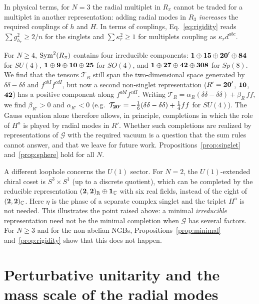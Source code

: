 \documentclass[aps,prd,twocolumn,superscriptaddress,nofootinbib,floatfix]{revtex4-2}
\theoremstyle{remark}
\newcommand{\G}{\mathcal{G}}
\begin{document}
In physical terms, for $N=3$ the radial multiplet in $R_\pi$ cannot be traded for a multiplet in another representation: adding radial modes in $R_3$ \emph{increases} the required couplings of $h$ and $H$. In terms of couplings, Eq.~\eqref{eq:rigidity} reads $\sum g_{h_r}^2\ge 2/n$ for the singlets and $\sum\kappa_r^2\ge1$ for multiplets coupling as $\kappa_r d^{abc}$.

For $N\ge4$, ${\rm Sym}^2(R_\pi)$ contains four irreducible components: ${\bf 1}\oplus{\bf 15}\oplus{\bf 20}'\oplus{\bf 84}$ for $SU(4)$, ${\bf 1}\oplus{\bf 9}\oplus{\bf 10}\oplus{\bf 25}$ for $SO(4)$, and ${\bf 1}\oplus{\bf 27}\oplus{\bf 42}\oplus{\bf 308}$ for $Sp(8)$. We find that the tensors $\mathcal{T}_R$ still span the two-dimensional space generated by $\delta\delta-\delta\delta$ and $f^{abI}f^{cdI}$, but now a second non-singlet representation ($R'={\bf 20}'$, ${\bf 10}$, ${\bf 42}$) has a positive component along $f^{abI}f^{cdI}$. Writing $\mathcal{T}_R=\alpha_R(\delta\delta-\delta\delta)+\beta_R\,ff$, we find $\beta_{R'}>0$ and $\alpha_{R'}<0$ (e.g.\ $\mathcal{T}_{{\bf 20}'}=-\frac16(\delta\delta-\delta\delta)+\frac14ff$ for $SU(4)$). The Gauss equation alone therefore allows, in principle, completions in which the role of $H^a$ is played by radial modes in $R'$. Whether such completions are realized by representations of $\G$ with the required vacuum is a question that the sum rules cannot answer, and that we leave for future work. Propositions~\ref{prop:singlet} and~\ref{prop:sphere} hold for all $N$.

A different loophole concerns the $U(1)$ sector. For $N=2$, the $U(1)$-extended chiral coset is $S^3\times S^1$ (up to a discrete quotient), which can be completed by the reducible representation $({\bf 2},{\bf 2})_{\mathbb R}\oplus{\bf 1}_{\mathbb C}$ with six real fields, instead of the eight of $({\bf 2},{\bf 2})_{\mathbb C}$. Here $\eta$ is the phase of a separate complex singlet and the triplet $H^a$ is not needed. This illustrates the point raised above: a minimal \emph{irreducible} representation need not be the minimal completion when $\G$ has several factors. For $N\ge3$ and for the non-abelian NGBs, Propositions~\ref{prop:minimal} and~\ref{prop:rigidity} show that this does not happen.

\section{Perturbative unitarity and the mass scale of the radial modes}
\label{sec:unitarity}
\end{document}
